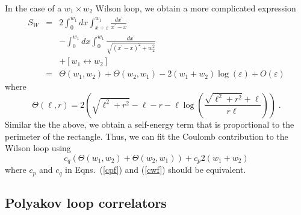 \documentclass[preprint,aps,prd]{revtex4-2}
\newcommand{\be}{\begin{equation}}
\newcommand{\eq}{\end{equation}}
\begin{document}
In the case of a $w_1\times w_2$ Wilson loop, we obtain
a more complicated expression
%
\begin{eqnarray}
  S_W &=& 2 \int_0^{w_1} dx \int_{x+\varepsilon}^{w_1} \frac{dx^\prime}{x^\prime-x}
               \nonumber\\
               & &  - \int_0^{w_1} dx \int_{0}^{w_1} \frac{dx^\prime}{
                 \sqrt{(x^\prime-x)^2+ w_2^2}}
               \nonumber\\
               & &  +\left[w_1 \leftrightarrow w_2 \right]\\
               &=&  \Theta\!\left(w_1, w_2\right) +
               \Theta\!\left(w_2, w_1\right)
              - 2 (w_1 + w_2) \log(\varepsilon) + O(\varepsilon) 
\end{eqnarray}
where
\be
\Theta\!\left(\ell, r\right) = 2 \left(
    \sqrt{\ell^2+r^2} - \ell - r
    - \ell\log\left(\frac{\sqrt{\ell^2+r^2} + \ell}{r\ell}\right)
   \right) \;.
\eq
Similar the the above, 
we obtain a self-energy term that is proportional to the perimeter of
the rectangle.  Thus, we can fit the Coulomb
contribution to the Wilson loop using
%
\be
    c_q  \left(\Theta\!\left(w_1, w_2\right) +
               \Theta\!\left(w_2, w_1\right)\right)
        + c_p  2\left(w_1+w_2\right)  \label{cwf}
\eq
%
where $c_p$ and $c_q$ in Eqns.~(\ref{cpf}) and (\ref{cwf})
should be equivalent.

\subsection{Polyakov loop correlators}
\end{document}
